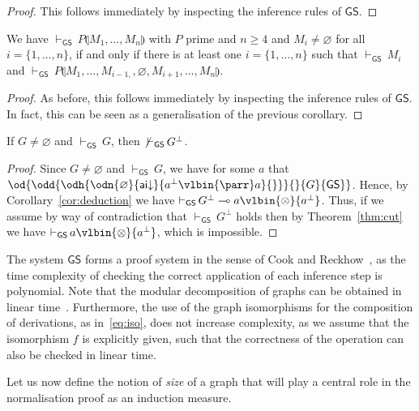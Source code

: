 \documentclass{lmcs} %
\newcommand{\proves}[2][]{\mathord{\vdash_{#1}\,}{#2}}
\renewcommand{\emptyset}{\varnothing}
\def\unit{\emptyset}
\def\GS{\mathsf{GS}}
\newcommand{\connn}[1]{\llparenthesis#1\rrparenthesis}
\def\aidr{\dairule}
\def\ods#1#2#3#4{\od{\odd{\odh{#1}}{#2}{#3}{#4}}}
\def\set#1{\{#1\}}
\def\cneg#1{{#1^\bot}}
\def\lpar{\vlbin{\parr}}
\def\ltens{\vlbin{\otimes}}
\def\airule{\mathsf{ai}}
\def\dairule{\airule\mathord{\downarrow}}
\def\gG{G}
\theoremstyle{plain}
\begin{document}
\begin{proof}
  This follows immediately by inspecting the inference rules of $\GS$. 
\end{proof}

\begin{cor}\label{cor:prime}
  We have\; $\proves[\GS]{P\connn{M_1,\ldots,M_n}}$ with $P$ prime and $n\ge 4$ and $M_i\neq\unit$ for all $i=\set{1,\ldots,n}$, if and only if there is at least one $i=\set{1,\ldots,n}$ such that
  \;$\proves[\GS]{M_i}$\; and 
  \;$\proves[\GS]{P\connn{M_1,\ldots,M_{i-1,},\unit,M_{i+1},\ldots,M_n}}$\;.
\end{cor}

\begin{proof}
 As before, this follows immediately by inspecting the inference rules
 of $\GS$. In fact, this can be seen as a generalisation of the
 previous corollary.
\end{proof}

\begin{cor}[consistency]\label{cor:consistency}
If $\gG \neq \unit$ and $\proves[\GS]{\gG}$, then $\not\proves[\GS]{\cneg{\gG}}$.
\end{cor}
\begin{proof}
Since $\gG \neq \unit$ and $\proves[\GS]{\gG}$, we have for some $a$ that
$\ods{\odn{\unit}{\aidr}{\cneg{a} \lpar a}{}}{}{\gG}{\GS}$.
Hence, by Corollary~\ref{cor:deduction} we have $\proves[\GS]{\cneg{\gG} \multimap a \ltens \cneg{a}}$.
Thus, if we assume by way of contradiction that $\proves[\GS]{\cneg{\gG}}$ holds then by Theorem~\ref{thm:cut}
we have $\proves[\GS]{a \ltens \cneg{a}}$, which is impossible.
\end{proof}


\begin{obs}\label{obs:cook-reckhow}
  The system $\GS$ forms a proof system in the sense of Cook and
  Reckhow~\cite{Cook1979}, as the time complexity of checking the
  correct application of each inference step is polynomial. Note that the modular
  decomposition of graphs can be obtained in linear
  time~\cite{mcc:ros:spi:linear}. Furthermore, the use of the graph isomorphisms
  for the composition of derivations, as in~\eqref{eq:iso}, does not
  increase complexity, as we assume that the isomorphism $f$ is
  explicitly given, such that the correctness of the operation can
  also be checked in linear time.
\end{obs}

Let us now define the notion of \emph{size}
of a graph that will play a central role in the normalisation proof as 
an induction measure.
\end{document}
